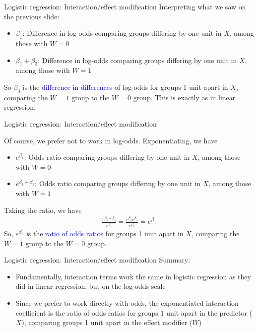 \documentclass[10pt,t]{beamer}
\begin{document}
\begin{frame}{Logistic regression: Interaction/effect modification}
	Interpreting what we saw on the previous slide:  
	\begin{itemize}
		\item $\beta_1$: Difference in log-odds comparing groups differing by one unit in $X$, among those with $W = 0$ 
		\item $\beta_1 + \beta_3$: Difference in log-odds comparing groups differing by one unit in $X$, among those with $W = 1$ 
	\end{itemize}
	So $\beta_3$ is the \textcolor{blue}{difference in differences} of log-odds for groups 1 unit apart in $X$, comparing the $W = 1$ group to the $W = 0$ group. This is exactly as in linear regression. 
\end{frame}

\begin{frame}{Logistic regression: Interaction/effect modification}
	
	Of course, we prefer not to work in log-odds. Exponentiating, we have 
	\begin{itemize}
		\item $e^{\beta_1}$: Odds ratio comparing groups differing by one unit in $X$, among those with $W = 0$ 
		\item $e^{\beta_1 + \beta_3}$: Odds ratio comparing groups differing by one unit in $X$, among those with $W = 1$ 
	\end{itemize}
	Taking the ratio, we have
	\begin{align*}
	\frac{e^{\beta_1 + \beta_3}}{e^{\beta_1}} = \frac{e^{\beta_1}e^{\beta_3}}{e^{\beta_1}} = e^{\beta_3}
	\end{align*} 
	So, $e^{\beta_3}$ is the \textcolor{blue}{ratio of odds ratios} for groups 1 unit apart in $X$, comparing the $W = 1$ group to the $W = 0$ group. 
\end{frame}

\begin{frame}{Logistic regression: Interaction/effect modification}
	Summary: 
	\begin{itemize}
		\item Fundamentally, interaction terms work the same in logistic regression as they did in linear regression, but on the log-odds scale
		\item Since we prefer to work directly with odds, the exponentiated interaction coefficient is the ratio of odds ratios for groups 1 unit apart in the predictor ($X$), comparing groups 1 unit apart in the effect modifier ($W$)
	\end{itemize}
\end{frame}
\end{document}
